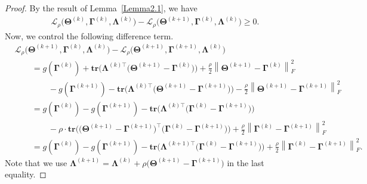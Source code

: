 \documentclass[alpha-refs]{wiley-article}
\begin{document}
\begin{proof}
By the result of Lemma~\ref{Lemma2.1}, we have
\begin{align} \label{ineq1}
    \mathcal{L}_{\rho} \big( \boldsymbol{\Theta}^{(k)},\boldsymbol{\Gamma}^{(k)},\boldsymbol{\Lambda}^{(k)} \big) 
    - \mathcal{L}_{\rho} \big( \boldsymbol{\Theta}^{(k+1)},\boldsymbol{\Gamma}^{(k)},\boldsymbol{\Lambda}^{(k)} \big)
    \geq 0.
\end{align}
Now, we control the following difference term.
\begin{align} \label{ineq2}
    &\mathcal{L}_{\rho} \big( \boldsymbol{\Theta}^{(k+1)},\boldsymbol{\Gamma}^{(k)},\boldsymbol{\Lambda}^{(k)} \big) 
    - \mathcal{L}_{\rho} \big( \boldsymbol{\Theta}^{(k+1)},\boldsymbol{\Gamma}^{(k+1)},\boldsymbol{\Lambda}^{(k)} \big) \nonumber \\
    &\qquad = g(\boldsymbol{\Gamma}^{(k)}) + \textbf{tr}\big( \boldsymbol{\Lambda}^{(k)\top}\big(\boldsymbol{\Theta}^{(k+1)}-\boldsymbol{\Gamma}^{(k)}\big)\big)
    +\frac{\rho}{2}\left\| \boldsymbol{\Theta}^{(k+1)}-\boldsymbol{\Gamma}^{(k)} \right\|_{F}^{2} \nonumber \\
    &\qquad \qquad - g(\boldsymbol{\Gamma}^{(k+1)}) - \textbf{tr}\big( \boldsymbol{\Lambda}^{(k)\top}\big(\boldsymbol{\Theta}^{(k+1)}-\boldsymbol{\Gamma}^{(k+1)}\big)\big)
    -\frac{\rho}{2}\left\| \boldsymbol{\Theta}^{(k+1)}-\boldsymbol{\Gamma}^{(k+1)} \right\|_{F}^{2} \nonumber \\
    &\qquad = g(\boldsymbol{\Gamma}^{(k)})-g(\boldsymbol{\Gamma}^{(k+1)}) - \textbf{tr}\big( \boldsymbol{\Lambda}^{(k)\top}\big(\boldsymbol{\Gamma}^{(k)}-\boldsymbol{\Gamma}^{(k+1)}\big)\big) \nonumber \\
    &\qquad \qquad - \rho \cdot \textbf{tr}\big( \big(\boldsymbol{\Theta}^{(k+1)}-\boldsymbol{\Gamma}^{(k+1)}\big)^{\top}
    \big(\boldsymbol{\Gamma}^{(k)}-\boldsymbol{\Gamma}^{(k+1)}\big) \big) + \frac{\rho}{2}\left\| \boldsymbol{\Gamma}^{(k)}-\boldsymbol{\Gamma}^{(k+1)} \right\|_{F}^{2}  \nonumber \\
    &\qquad = g(\boldsymbol{\Gamma}^{(k)})-g(\boldsymbol{\Gamma}^{(k+1)}) - \textbf{tr}\big( \boldsymbol{\Lambda}^{(k+1)\top}\big(\boldsymbol{\Gamma}^{(k)}-\boldsymbol{\Gamma}^{(k+1)}\big)\big) + \frac{\rho}{2}\left\| \boldsymbol{\Gamma}^{(k)}-\boldsymbol{\Gamma}^{(k+1)} \right\|_{F}^{2}.
\end{align}
Note that we use $\boldsymbol{\Lambda}^{(k+1)}=\boldsymbol{\Lambda}^{(k)}+\rho\big(\boldsymbol{\Theta}^{(k+1)}-\boldsymbol{\Gamma}^{(k+1)}\big)$ in the last equality.

\end{proof}
\end{document}

